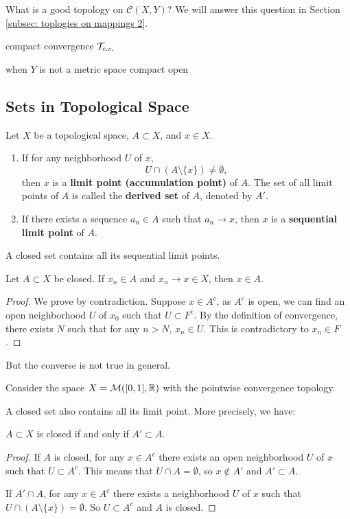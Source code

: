 What is a good topology on $\mathcal{C}(X,Y)$? We will answer this question in Section \ref{subsec: toplogies on mappings 2}.

compact convergence $\mathcal{T}_{c.c.}$

when $Y$ is not a metric space
compact open


\subsection{Sets in Topological Space}





\begin{definition}
    Let $X$ be a topological space, $A\subset X$, and $x\in X$.
    \begin{enumerate}[label=(\roman*)]
        \item If for any neighborhood $U$ of $x$, $$U\cap(A\setminus\{x\})\neq\emptyset,$$ then $x$ is a \textbf{limit point (accumulation point)} of $A$.
        The set of all limit points of $A$ is called the \textbf{derived set} of $A$, denoted by $A'$.
        \item If there exists a sequence $a_n\in A$ such that $a_n\to x$, then $x$ is a \textbf{sequential limit point} of $A$. 
    \end{enumerate}
\end{definition}


A closed set contains all its sequential limit points.
\begin{proposition}
    Let $A\subset X$ be closed. If $x_n\in A$ and $x_n\to x\in X$, then $x\in A$.
\end{proposition}
\begin{proof}
    We prove by contradiction. Suppose $x\in A^c$, as $A^c$ is open, we can find an open neighborhood $U$ of $x_0$ such that $U\subset F^c$.
    By the definition of convergence, there exists $N$ such that for any $n>N$, $x_n\in U$. This is contradictory to $x_n\in F$.
\end{proof}
But the converse is not true in general.
\begin{example}
    Consider the space $X=\mathcal{M}([0,1],\mathbb{R})$ with the pointwise convergence topology.
\end{example}

A closed set also contains all its limit point. More precisely, we have:
\begin{proposition}
    $A\subset X$ is closed if and only if $A'\subset A$.
\end{proposition}
\begin{proof}
    If $A$ is closed, for any $x\in A^c$ there exists an open neighborhood $U$ of $x$ such that $U\subset A^c$.
    This means that $U\cap A=\emptyset$, so $x\notin A'$ and $A'\subset A$.
    
    If $A'\cap A$, for any $x\in A^c$ there exists a neighborhood $U$ of $x$ such that $U\cap (A\setminus\{x\})=\emptyset$.
    So $U\subset A^c$ and $A$ is closed.
\end{proof}


